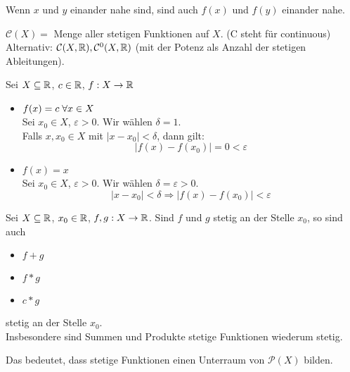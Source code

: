 \documentclass[main.tex]{subfiles}
\begin{document}
\begin{Bemerkung}[informell]
  Wenn $x$ und $y$ einander nahe sind, sind auch $f(x)$ und $f(y)$ einander nahe.
\end{Bemerkung}

\begin{Bemerkung}
  $\mathcal{C}(X) = $ Menge aller stetigen Funktionen auf $X$. (C steht für continuous)\\
  Alternativ: $\mathcal{C}(X, \mathbb{R}), \mathcal{C}^0(X,\mathbb{R})$ (mit der Potenz als Anzahl der stetigen Ableitungen).
\end{Bemerkung}

\begin{Beispiel}
  Sei $X \subseteq \mathbb{R}$, $c \in \mathbb{R}$, $f: X \to \mathbb{R}$
  \begin{itemize}
    \item $f(x) = c \;\forall x \in X$\\
    Sei $x_0 \in X$, $\varepsilon > 0$. Wir wählen $\delta = 1$.\\
    Falls $x,x_0 \in X$ mit $|x - x_0| < \delta$, dann gilt:
    $$|f(x) - f(x_0)| = 0 < \varepsilon$$
    \item $f(x) = x$\\
    Sei $x_0 \in X$, $\varepsilon > 0$. Wir wählen $\delta = \varepsilon > 0$.\\
    $$|x - x_0| < \delta \Rightarrow |f(x) - f(x_0)| < \varepsilon$$
  \end{itemize}
\end{Beispiel}

\begin{Theorem}
    Sei $X \subseteq \mathbb{R}$, $x_0 \in \mathbb{R}$, $f,g : X \to \mathbb{R}$. Sind $f$ und $g$ stetig an der Stelle $x_0$, so sind auch
    \begin{itemize}
      \item $f+g$
      \item $f*g$
      \item $c*g$
    \end{itemize}
    stetig an der Stelle $x_0$.\\
    Insbesondere sind Summen und Produkte stetige Funktionen wiederum stetig.
\end{Theorem}

\begin{Bemerkung}
  Das bedeutet, dass stetige Funktionen einen Unterraum von $\mathcal{P}(X)$ bilden.
\end{Bemerkung}
\end{document}
